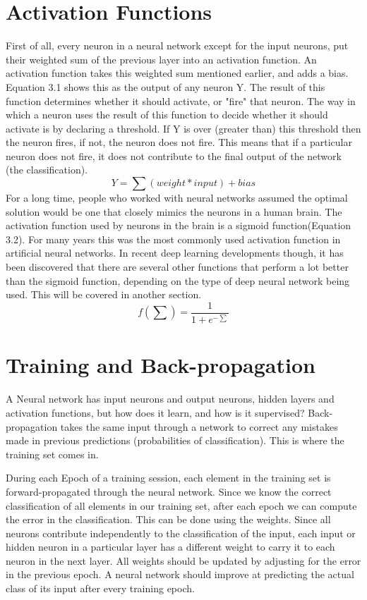 \documentclass[12pt]{report} %
\begin{document}
\section{Activation Functions}	
	First of all, every neuron in a neural network except for the input neurons, put their weighted sum of the previous layer into an activation function. An activation function takes this weighted sum mentioned earlier, and adds a bias. Equation 3.1 shows this as the output of any neuron Y. The result of this function determines whether it should activate, or "fire" that neuron. The way in which a neuron uses the result of this function to decide whether it should activate is by declaring a threshold. If Y is over (greater than) this threshold then the neuron fires, if not, the neuron does not fire. This means that if a particular neuron does not fire, it does not contribute to the final output of the network (the classification)\cite{activationMedium}. 
\begin{equation}
Y = \sum  (weight * input) + bias
\end{equation}	
	For a long time, people who worked with neural networks assumed the optimal solution would be one that closely mimics the neurons in a human brain. The activation function used by neurons in the brain is a sigmoid function(Equation 3.2)\cite{KubatMachineLearn}. For many years this was the most commonly used activation function in artificial neural networks. In recent deep learning developments though, it has been discovered that there are several other functions that perform a lot better than the sigmoid function, depending on the type of deep neural network being used. This will be covered in another section.
\begin{equation}
f(\sum) = \frac{1}{1+e^{-\sum}}
\end{equation}		 

\section{Training and Back-propagation}	

 	A Neural network has input neurons and output neurons, hidden layers and activation functions, but how does it learn, and how is it supervised? Back-propagation takes the same input through a network to correct any mistakes made in previous predictions (probabilities of classification). This is where the training set comes in. 
	
	During each Epoch of a training session, each element in the training set is forward-propagated through the neural network. Since we know the correct classification of all elements in our training set, after each epoch we can compute the error in the classification. This can be done using the weights. Since all neurons contribute independently to the classification of the input, each input or hidden neuron in a particular layer has a different weight to carry it to each neuron in the next layer. All weights should be updated by adjusting for the error in the previous epoch. A neural network should improve at predicting the actual class of its input after every training epoch. 
	
\end{document}
